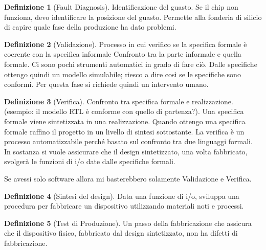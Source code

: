 \documentclass[a4paper]{article}
\theoremstyle{definition}
\newtheorem{dfn}{Definizione}[]
\begin{document}
		\begin{dfn}[Fault Diagnosis]
			Identificazione del guasto.	Se il chip non funziona, devo identificare la posizione del guasto. Permette alla fonderia di silicio di capire quale fase della produzione ha dato problemi.
		\end{dfn}
		
		\begin{dfn}[Validazione]
			Processo in cui verifico se la specifica formale è coerente con la specifica informale
			Confronto tra la parte informale e quella formale. Ci sono pochi strumenti automatici in grado di fare ciò. Dalle specifiche ottengo quindi un modello simulabile; riesco a dire così se le specifiche sono conformi. Per questa fase si richiede quindi un intervento umano.
		\end{dfn}
		
		\begin{dfn}[Verifica]
			Confronto tra specifica formale e realizzazione. (esempio: il modello RTL è conforme con quello di partenza?). Una specifica formale viene sintetizzata in una realizzazione. Quando ottengo una specifica formale raffino il progetto in un livello di sintesi sottostante. La verifica è un processo automatizzabile perché basato sul confronto tra due linguaggi formali.\\ 
			In sostanza si vuole assicurare che il design sintetizzato, una volta fabbricato, svolgerà le funzioni di i/o date dalle specifiche formali.
		\end{dfn}
		Se avessi solo software allora mi basterebbero solamente Validazione e Verifica.
		
		\begin{dfn}[Sintesi del design]
			Data una funzione di i/o, sviluppa una procedura per fabbricare un dispositivo utilizzando materiali noti e processi.
		\end{dfn}
		
		\begin{dfn}[Test di Produzione]
			Un passo della fabbricazione che assicura che il dispositivo fisico, fabbricato dal design sintetizzato, non ha difetti di fabbricazione.
		\end{dfn}
		
\end{document}
